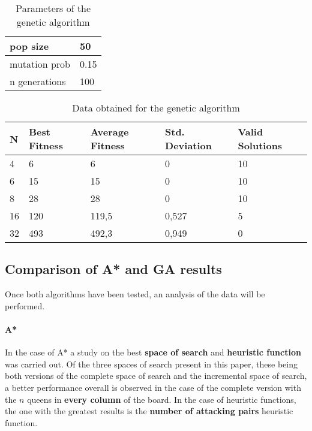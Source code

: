 \documentclass[]{llncs}
\begin{document}
\begin{table}[H]
    \centering
    \begin{tabular}{l|l}
        pop size      & 50   \\ \hline
        mutation prob & 0.15 \\ \hline
        n generations & 100 
    \end{tabular}
    \caption{Parameters of the genetic algorithm}
    \label{tab:ag-parameters}
\end{table}

\begin{table}[H]
    \centering
    \begin{tabular}{|l|l|l|l|l|}
        N  & Best Fitness & Average Fitness & Std. Deviation & Valid Solutions      \\ \hline
        4  & 6            & 6               & 0              & 10                   \\
        6  & 15           & 15              & 0              & 10                   \\
        8  & 28           & 28              & 0              & 10                   \\
        16 & 120          & 119,5           & 0,527          & 5                    \\
        32 & 493          & 492,3           & 0,949          & 0
    \end{tabular}
    \caption{Data obtained for the genetic algorithm}
    \label{tab:ag-data}
\end{table}
\subsection{Comparison of A* and GA results}\label{comparison_astar_gen}
Once both algorithms have been tested, an analysis of the data will be performed.

\paragraph{A*} 
In the case of A* a study on the best \textbf{space of search} and \textbf{heuristic function} was carried out. Of the three spaces of search present in this paper, these being both versions of the complete space of search and the incremental space of search, a better performance overall is observed in the case of the complete version with the $n$ queens in \textbf{every column} of the board. In the case of heuristic functions, the one with the greatest results is the \textbf{number of attacking pairs} heuristic function.
\end{document}
